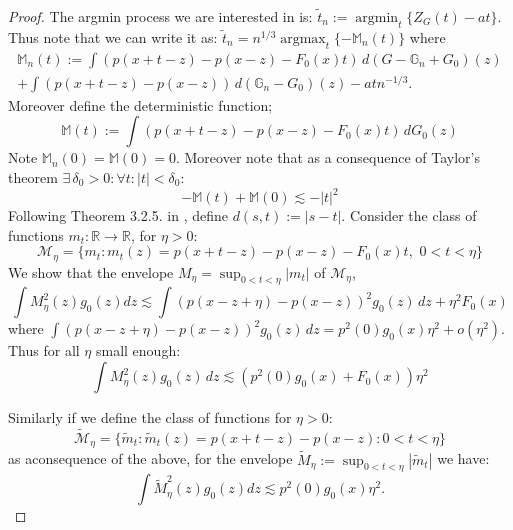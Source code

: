 \begin{proof}
The argmin process we are interested in is: $\tilde{t}_n := \operatorname{argmin}_t \{ Z_{\scriptscriptstyle{G}}(t) - a t \}$. Thus note that we can write it as: $\tilde{t}_n = n^{1/3} \operatorname{argmax}_t \{ - \mathbb{M}_n(t) \}$ where
\begin{align*} 
	\mathbb{M}_n(t) := \int (p(x+t-z) - p(x-z) - F_0(x)t) \, d(G - \mathbb{G}_n + G_0)(z) \\ + \int (p(x+t-z) - p(x-z)) \, d(\mathbb{G}_n - G_0)(z) - a t n^{-1/3}. 
\end{align*}
Moreover define the deterministic function;
\[ \mathbb{M}(t) := \int (p(x+t-z) - p(x-z) - F_0(x)t) \, dG_0(z) \]
Note $\mathbb{M}_n(0) = \mathbb{M}(0) = 0$. Moreover note that as a consequence of Taylor's theorem $\exists \, \delta_0 > 0: \forall t : |t| < \delta_0$:
\[ -\mathbb{M}(t) + \mathbb{M}(0) \lesssim -|t|^2 \]
Following Theorem 3.2.5. in \cite{5}, define $d(s,t) := |s-t|$. Consider the class of functions $m_t: \mathbb{R} \to \mathbb{R}$, for $\eta >0$:
\[ \mathcal{M}_\eta = \{ m_t : m_t(z) = p(x+t-z) - p(x-z) - F_0(x)t, \, \, 0 < t < \eta \} \]
We show that the envelope $M_\eta = \sup_{0<t<\eta} |m_t| $ of $\mathcal{M}_\eta$,
\[ \int M_\eta^2(z) g_0(z) dz \lesssim \int (p(x-z+\eta) - p(x-z))^2 g_0(z) \, dz + \eta^2 F_0(x) \]
where $\int (p(x-z+\eta) - p(x-z))^2 g_0(z) \, dz = p^2(0) g_0(x) \eta^2 + o(\eta^2)$. Thus for all $\eta$ small enough:
\[ \int M_\eta^2(z) g_0(z) \, dz \lesssim (p^2(0) g_0(x) + F_0(x)) \eta^2 \]

Similarly if we define the class of functions for $\eta >0$:
\[ \tilde{\mathcal{M}}_\eta = \{ \tilde{m}_t : \tilde{m}_t(z) = p(x+t-z) - p(x-z) : 0 < t < \eta \} \]
as aconsequence of the above, for the envelope $\tilde{M}_\eta := \sup_{0<t<\eta} |\tilde{m}_t|$ we have:
\[ \int \tilde{M}_\eta^2(z) g_0(z) dz \lesssim p^2(0) g_0(x) \eta^2. \]


\end{proof}
